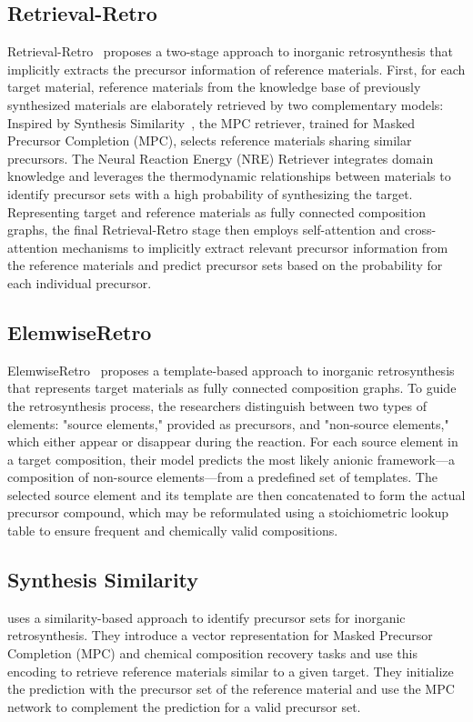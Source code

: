 \subsection{Retrieval-Retro}
Retrieval-Retro~\cite{noh2024retrieval} proposes a two-stage approach to inorganic retrosynthesis that implicitly extracts the precursor information of reference materials. First, for each target material, reference materials from the knowledge base of previously synthesized materials are elaborately retrieved by two complementary models: Inspired by Synthesis Similarity~\cite{he2023precursor}, the MPC retriever, trained for Masked Precursor Completion (MPC), selects reference materials sharing similar precursors. The Neural Reaction Energy (NRE) Retriever integrates domain knowledge and leverages the thermodynamic relationships between materials to identify precursor sets with a high probability of synthesizing the target. Representing target and reference materials as fully connected composition graphs, the final Retrieval-Retro stage then employs self-attention and cross-attention mechanisms to implicitly extract relevant precursor information from the reference materials and predict precursor sets based on the probability for each individual precursor.

\subsection{ElemwiseRetro}
ElemwiseRetro~\cite{kim2022element} proposes a template-based approach to inorganic retrosynthesis that represents target materials as fully connected composition graphs. To guide the retrosynthesis process, the researchers distinguish between two types of elements: "source elements," provided as precursors, and "non-source elements," which either appear or disappear during the reaction. For each source element in a target composition, their model predicts the most likely anionic framework—a composition of non-source elements—from a predefined set of templates. The selected source element and its template are then concatenated to form the actual precursor compound, which may be reformulated using a stoichiometric lookup table to ensure frequent and chemically valid compositions.


\subsection{Synthesis Similarity}
\citet{he2023precursor} uses a similarity-based approach to identify precursor sets for inorganic retrosynthesis. They introduce a vector representation for Masked Precursor Completion (MPC) and chemical composition recovery tasks and use this encoding to retrieve reference materials similar to a given target. They initialize the prediction with the precursor set of the reference material and use the MPC network to complement the prediction for a valid precursor set.

